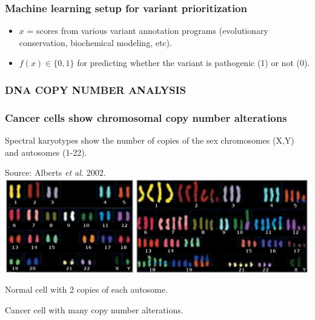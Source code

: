 \documentclass{beamer}
\begin{document}
\begin{frame}
  \frametitle{Machine learning setup for variant prioritization}
  \begin{itemize}
  \item $x$ = scores from various variant annotation programs (evolutionary
    conservation, biochemical modeling, etc).
  \item $f(x)\in\{0,1\}$ for predicting whether the variant is pathogenic (1) or not (0).
  \end{itemize}
\end{frame}

\begin{frame}
  \frametitle{DNA COPY NUMBER ANALYSIS}
\end{frame}

\begin{frame}
  \frametitle{Cancer cells show chromosomal copy number alterations}
  Spectral karyotypes show the number of copies of the sex chromosomes
  (X,Y) and autosomes (1-22). 

  Source: Alberts \emph{et al.} 2002.
\vskip 0.1in
  \includegraphics[width=\textwidth]{Karyo-both}
\vskip 0.1in
  \begin{minipage}{0.4\linewidth}
    Normal cell with 2 copies of each autosome.
  \end{minipage}
\linewidth
  \begin{minipage}{0.4\linewidth}
Cancer cell with many copy number alterations.
  \end{minipage}
\end{frame}
\end{document}
